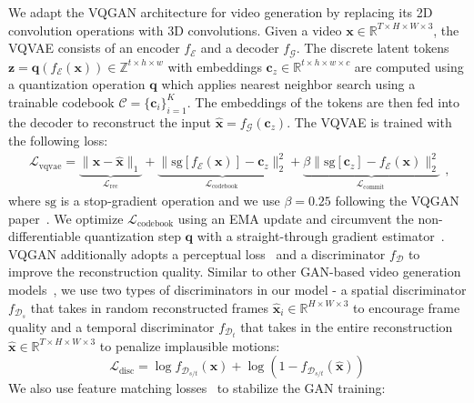 We adapt the VQGAN architecture for video generation by replacing its 2D convolution operations with 3D convolutions. 
Given a video $\mathbf{x} \in \mathbb{R}^{T\times H\times W\times 3}$, the VQVAE consists of an encoder $f_\mathcal{E}$ and a decoder $f_\mathcal{G}$. 
The discrete latent tokens $\mathbf{z} = \mathbf{q}(f_\mathcal{E}(\mathbf{x})) \in \mathbb{Z}^{t\times h\times w}$ with embeddings $\mathbf{c}_z \in \mathbb{R}^{t\times h\times w \times c}$ are computed using a quantization operation $\mathbf{q}$ which applies nearest neighbor search using a trainable codebook $\mathcal{C}=\{\mathbf{c}_i\}_{i=1}^K$. The embeddings of the tokens are then fed into the decoder to reconstruct the input $\hat{\mathbf{x}}=f_\mathcal{G}(\mathbf{c}_z)$. 
The VQVAE is trained with the following loss:    
$$\begin{aligned}
\mathcal{L}_\text{vqvae}=\underbrace{\|\mathbf{x}-\hat{\mathbf{x}}\|_1}_{\mathcal{L}_{\text {rec}}}+\underbrace{\|\mathrm{sg}[f_\mathcal{E}(\mathbf{x})]-\mathbf{c}_z\|_{2}^{2}}_{\mathcal{L}_{\text {codebook }}}+\underbrace{\beta\|\mathrm{sg}\left[\mathbf{c}_z\right]-f_\mathcal{E}(\mathbf{x})\|_{2}^{2}}_{\mathcal{L}_{\text {commit }}}
\end{aligned},$$ 
where $\mathrm{sg}$ is a stop-gradient operation and we use $\beta=0.25$ following the VQGAN paper~\cite{esser2021taming}. 
We optimize $\mathcal{L}_{\text {codebook}}$ using an EMA update
and circumvent the non-differentiable quantization step $\mathbf{q}$ with a straight-through gradient estimator~\cite{van2017neural}. 
VQGAN additionally adopts a perceptual loss~\cite{johnson2016perceptual,zhang2018unreasonable} and a discriminator $f_\mathcal{D}$ to improve the reconstruction quality. 
Similar to other GAN-based video generation models~\cite{Tulyakov_2018_CVPR,clark2019adversarial}, we use two types of discriminators in our model - %
a spatial discriminator $f_{\mathcal{D}_s}$ that takes in random reconstructed frames $\hat{\mathbf{x}}_i \in \mathbb{R}^{H\times W\times 3}$ to encourage frame quality and a temporal discriminator $f_{\mathcal{D}_t}$ that takes in the entire reconstruction $\hat{\mathbf{x}} \in \mathbb{R}^{T\times H\times W\times 3}$ to penalize implausible motions:
$$
\mathcal{L}_\text{disc}= \log f_{\mathcal{D}_{s / t}}(\mathbf{x}) + \log(1 - f_{\mathcal{D}_{s / t}}(\hat{\mathbf{x}}))
$$
We also use feature matching losses~\cite{wang2018high,wang2018video} to stabilize the GAN training:
